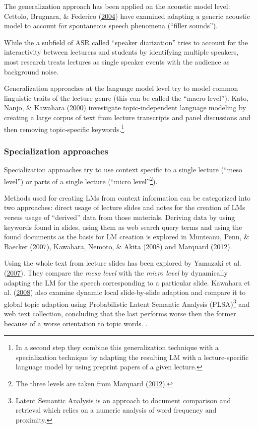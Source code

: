 \documentclass[]{article}
\begin{document}
The generalization approach has been applied on the acoustic model
level: Cettolo, Brugnara, \& Federico (\hyperref[ref-cettolo]{2004})
have examined adapting a generic acoustic model to account for
spontaneous speech phenomena (``filler sounds'').

While the a subfield of ASR called ``speaker diarization'' tries to
account for the interactivity between lecturers and students by
identifying multiple speakers, most research treats lectures as single
speaker events with the audience as background noise.

Generalization approaches at the language model level try to model
common linguistic traits of the lecture genre (this can be called the
``macro level''). Kato, Nanjo, \& Kawahara
(\hyperref[ref-kato2000]{2000}) investigate topic-independent language
modeling by creating a large corpus of text from lecture transcripts and
panel discussions and then removing topic-specific keywords.\footnote{In
  a second step they combine this generalization technique with a
  specialization technique by adapting the resulting LM with a
  lecture-specific language model by using preprint papers of a given
  lecture.}

\subsubsection{Specialization
approaches}\label{specialization-approaches}

Specialization approaches try to use context specific to a single
lecture (``meso level'') or parts of a single lecture (``micro
level''\footnote{The three levels are taken from Marquard
  (\hyperref[ref-marquard]{2012}).}).

Methods used for creating LMs from context information can be
categorized into two approaches: direct usage of lecture slides and
notes for the creation of LMs versus usage of ``derived'' data from
those materials. Deriving data by using keywords found in slides, using
them as web search query terms and using the found documents as the
basis for LM creation is explored in Munteanu, Penn, \& Baecker
(\hyperref[ref-munteanu]{2007}), Kawahara, Nemoto, \& Akita
(\hyperref[ref-kawahara08]{2008}) and Marquard
(\hyperref[ref-marquard]{2012}).

Using the whole text from lecture slides has been explored by Yamazaki
et al. (\hyperref[ref-yamazaki]{2007}). They compare the \emph{meso
level} with the \emph{micro level} by dynamically adapting the LM for
the speech corresponding to a particular slide. Kawahara et al.
(\hyperref[ref-kawahara08]{2008}) also examine dynamic local
slide-by-slide adaption and compare it to global topic adaption using
Probabilistic Latent Semantic Analysis (PLSA)\footnote{Latent Semantic
  Analysis is an approach to document comparison and retrieval which
  relies on a numeric analysis of word frequency and proximity. } and
web text collection, concluding that the last performs worse then the
former because of a worse orientation to topic words. .
\end{document}

